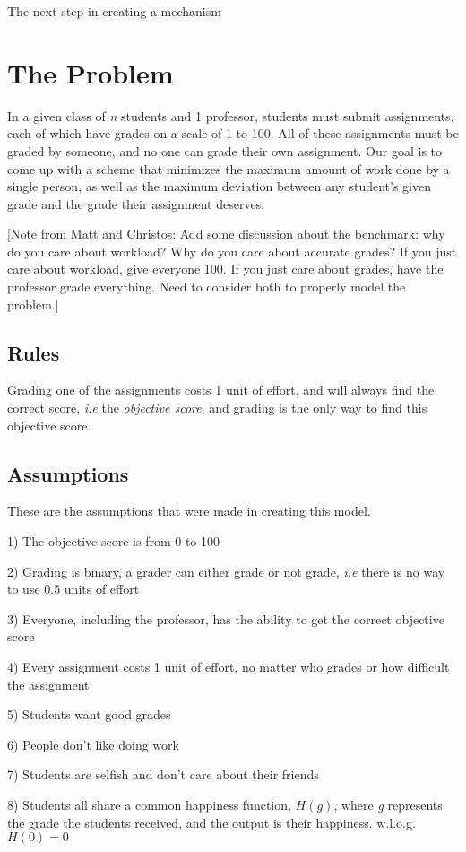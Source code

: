 \documentclass[12pt, Arial]{article}
\begin{document}
The next step in creating a mechanism
\section{The Problem}
In a given class of \emph{n} students and 1 professor, students must submit assignments, each of which have grades on a scale of 1 to 100. All of these assignments must be graded by someone, and no one can grade their own assignment. Our goal is to come up with a scheme that minimizes the maximum amount of work done by a single person, as well as the maximum deviation between any student's given grade and the grade their assignment deserves.


[Note from Matt and Christos: Add some discussion about the benchmark: why do you care about workload? Why do you care about accurate grades? If you just care about workload, give everyone 100. If you just care about grades, have the professor grade everything. Need to consider both to properly model the problem.]

\subsection{Rules}
Grading one of the assignments costs 1 unit of effort, and will always find the correct score, \emph{i.e} the \emph{objective score}, and grading is the only way to find this objective score.
\subsection{Assumptions}
These are the assumptions that were made in creating this model.

1) The objective score is from 0 to 100

2) Grading is binary, a grader can either grade or not grade, \emph{i.e} there is no way to use 0.5 units of effort

3) Everyone, including the professor, has the ability to get the correct objective score

4) Every assignment costs 1 unit of effort, no matter who grades or how difficult the assignment

5) Students want good grades

6) People don't like doing work

7) Students are selfish and don't care about their friends

8) Students all share a common happiness function, $H(g)$, where \emph{g} represents the grade the students received, and the output is their happiness. w.l.o.g. $H(0)=0$
\end{document}
